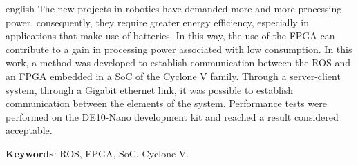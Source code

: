 \begin{resumo}[Abstract]
 \begin{otherlanguage*}{english}
  The new projects in robotics have demanded more and more processing power, consequently, they require greater energy efficiency, especially in applications that make use of batteries. In this way, the use of the FPGA can contribute to a gain in processing power associated with low consumption. In this work, a method was developed to establish communication between the ROS and an FPGA embedded in a SoC of the Cyclone V family. Through a server-client system, through a Gigabit ethernet link, it was possible to establish communication between the elements of the system. Performance tests were performed on the DE10-Nano development kit and reached a result considered acceptable.

   \vspace{\onelineskip}
 
   \noindent 
   \textbf{Keywords}: ROS, FPGA, SoC, Cyclone V.
 \end{otherlanguage*}
\end{resumo}

% 

%  

